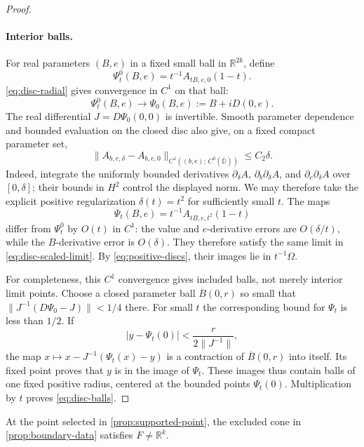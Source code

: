 \begin{proof}
\paragraph{Interior balls.}
For real parameters $(B,e)$ in a fixed small ball in $\mathbb{R}^{2k}$, define
\[
 \Psi_t^0(B,e)=t^{-1}A_{tB,e,0}(1-t).
\]
\eqref{eq:disc-radial} gives convergence in $C^1$ on that ball:
\begin{equation}\label{eq:disc-scaled-limit}
 \Psi_t^0(B,e)\longrightarrow\Psi_0(B,e):=B+iD(0,e).
\end{equation}
The real differential $J=D\Psi_0(0,0)$ is invertible. Smooth parameter dependence and bounded evaluation on the closed disc also give, on a fixed compact parameter set,
\[
 \|A_{b,e,\delta}-A_{b,e,0}\|
       _{C^1((b,e);\,C^0(\overline{\mathbb{D}}))}\le C_2\delta.
\]
Indeed, integrate the uniformly bounded derivatives $\partial_\delta A$, $\partial_b\partial_\delta A$, and $\partial_e\partial_\delta A$ over $[0,\delta]$; their bounds in $H^2$ control the displayed norm. We may therefore take the explicit positive regularization $\delta(t)=t^2$ for sufficiently small $t$.  The maps
\[
 \Psi_t(B,e)=t^{-1}A_{tB,e,t^2}(1-t)
\]
differ from $\Psi_t^0$ by $O(t)$ in $C^1$: the value and $e$-derivative errors are $O(\delta/t)$, while the $B$-derivative error is $O(\delta)$. They therefore satisfy the same limit in \eqref{eq:disc-scaled-limit}.  By \eqref{eq:positive-discs}, their images lie in $t^{-1}\Omega$.

For completeness, this $C^1$ convergence gives included balls, not merely interior limit points.  Choose a closed parameter ball $\overline B(0,r)$ so small that $\|J^{-1}(D\Psi_0-J)\|<1/4$ there.  For small $t$ the corresponding bound for $\Psi_t$ is less than $1/2$.  If
\[
 |y-\Psi_t(0)|<\frac{r}{2\|J^{-1}\|},
\]
the map $x\mapsto x-J^{-1}(\Psi_t(x)-y)$ is a contraction of $\overline B(0,r)$ into itself.  Its fixed point proves that $y$ is in the image of $\Psi_t$.  These images thus contain balls of one fixed positive radius, centered at the bounded points $\Psi_t(0)$. Multiplication by $t$ proves \eqref{eq:disc-balls}.
\end{proof}

\begin{proposition}\label{prop:noncollapse}
At the point selected in \cref{prop:supported-point}, the excluded cone in \cref{prop:boundary-data} satisfies $F\ne\mathbb{R}^k$.
\end{proposition}

